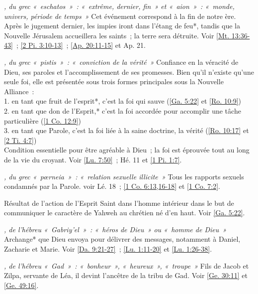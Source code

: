 \begin{multicols}{2}
\textit{, du grec «~eschatos~»~: «~extrême, dernier, fin~» et «~aion~»~: «~monde, univers, période de temps~»}\newline
Cet événement correspond à la fin de notre ère. Après le jugement dernier, les impies iront dans l'étang de feu*, tandis que la Nouvelle Jérusalem accueillera les saints~; la terre sera détruite. Voir \vref{Mt. 13:36-43}~; \vref{2 Pi. 3:10-13}~; \vref{Ap. 20:11-15} et Ap. 21.

\textit{, du grec «~pistis~»~: «~conviction de la vérité~»}\newline
Confiance en la véracité de Dieu, ses paroles et l'accomplissement de ses promesses. Bien qu'il n'existe qu'une seule foi, elle est présentée sous trois formes principales sous la Nouvelle Alliance~:
\\1. en tant que fruit de l'esprit*, c'est la foi qui sauve (\vref{Ga. 5:22} et \vref{Ro. 10:9})
\\2. en tant que don de l'Esprit,* c'est la foi accordée pour accomplir une tâche particulière (\vref{1 Co. 12:9})
\\3. en tant que Parole, c'est la foi liée à la saine doctrine, la vérité (\vref{Ro. 10:17} et \vref{2 Ti. 4:7})
\\Condition essentielle pour être agréable à Dieu~; la foi est éprouvée tout au long de la vie du croyant. Voir \vref{Lu. 7:50}~; Hé. 11 et \vref{1 Pi. 1:7}.

\textit{, du grec «~pœrneia~»~: «~relation sexuelle illicite~»}\newline
Tous les rapports sexuels condamnés par la Parole. voir Lé. 18~; \vref{1 Co. 6:13,16-18} et \vref{1 Co. 7:2}.

\textit{}\newline
Résultat de l'action de l'Esprit Saint dans l'homme intérieur dans le but de communiquer le caractère de Yahweh au chrétien né d'en haut.\newline
Voir \vref{Ga. 5:22}.

\textit{, de l'hébreu «~Gabriy'el~»~: «~héros de Dieu~» ou «~homme de Dieu~»}\newline
Archange* que Dieu envoya pour délivrer des messages, notamment à Daniel, Zacharie et Marie. Voir \vref{Da. 9:21-27}~; \vref{Lu. 1:11-20} et \vref{Lu. 1:26-38}.

\textit{, de l'hébreu «~Gad~»~: «~bonheur~», «~heureux~», «~troupe~»}\newline
Fils de Jacob et Zilpa, servante de Léa, il devint l'ancêtre de la tribu de Gad.\newline
Voir \vref{Ge. 30:11} et \vref{Ge. 49:16}.


\end{multicols}
